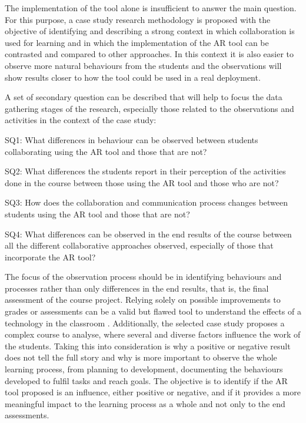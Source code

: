 The implementation of the tool alone is insufficient to answer the main question. For this purpose, a case study research methodology is proposed with the
objective of identifying and describing a strong context in which collaboration is used for learning and in which the implementation of the \ac{AR} tool can
be contrasted and compared to other approaches. In this context it is also easier to observe more natural behaviours from the students and the observations
will show results closer to how the tool could be used in a real deployment.

A set of secondary question can be described that will help to focus the data gathering stages of the research, especially those related to the observations and activities
in the context of the case study:

\begin{displayquote}
    SQ1: What differences in behaviour can be observed between students collaborating using the \ac{AR} tool and those that are not?
\end{displayquote}

\begin{displayquote}
    SQ2: What differences the students report in their perception of the activities done in the course between those using the \ac{AR} tool and those who are not? 
\end{displayquote}

\begin{displayquote}
    SQ3: How does the collaboration and communication process changes between students using the \ac{AR} tool and those that are not? 
\end{displayquote}

\begin{displayquote}
    SQ4: What differences can be observed in the end results of the course between all the different collaborative approaches observed, especially of those that incorporate the
    \ac{AR} tool? 
\end{displayquote}

The focus of the observation process should be in identifying behaviours and processes rather than only differences in the end results, that is, the final assessment of the
course project. Relying solely on possible improvements to grades or assessments can be a valid but flawed tool to understand the effects of a technology in the classroom \parencite{katz_2017,dalziel_1998}.
Additionally, the selected case study proposes a complex course to analyse, where several and diverse factors influence the work of the students. Taking this into consideration
is why a positive or negative result does not tell the full story and why is more important to observe the whole learning process, from planning to development, documenting the
behaviours developed to fulfil tasks and reach goals. The objective is to identify if the \ac{AR} tool proposed is an influence, either positive or negative, and if it provides
a more meaningful impact to the learning process as a whole and not only to the end assessments.


